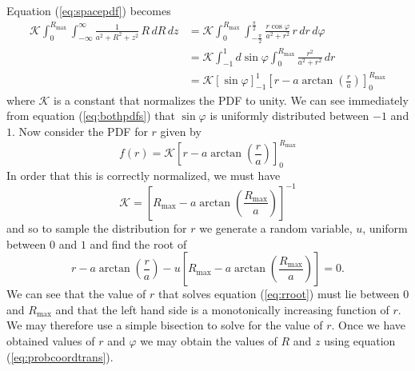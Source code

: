 Equation (\ref{eq:spacepdf}) becomes
\begin{equation}
\begin{split}
\mathcal{K} \int_0^{R_\mathrm{max}}\int_{-\infty}^{\infty} \frac{1}{a^2 + R^2 + z^2}\,R\, dR\, dz 
&= \mathcal{K} \int_0^{R_{\mathrm{max}}}\int_{-\frac{\pi}{2}}^{\frac{\pi}{2}} \frac{r\cos\varphi}{a^2+r^2}\,r\, dr \, d\varphi \\
&= \mathcal{K} \int_{-1}^{1} d\sin\varphi \int_0^{R_{\mathrm{max}}} \frac{r^2}{a^2+r^2}\, dr \\
&= \mathcal{K} \left[\sin\varphi\right]_{-1}^1 \left[r -
a\arctan\left(\frac{r}{a}\right)\right]_0^{R_{\mathrm{max}}}
\end{split}
\label{eq:bothpdfs}
\end{equation}
where $\mathcal{K}$ is a constant that normalizes the PDF to unity. We can see
immediately from equation (\ref{eq:bothpdfs}) that $\sin\varphi$ is uniformly
distributed between $-1$ and $1$. Now consider the PDF for $r$ given by
\begin{equation}
f(r) = \mathcal{K} \left[r - a\arctan\left(\frac{r}{a}\right)\right]_0^{R_{\mathrm{max}}}
\end{equation}
In order that this is correctly normalized, we must have
\begin{equation}
\mathcal{K} = 
\left[R_\mathrm{max} -
a\arctan\left(\frac{R_\mathrm{max}}{a}\right)\right]^{-1}
\end{equation}
and so to sample the distribution for $r$ we generate a random variable, $u$,
uniform between $0$ and $1$ and find the root of
\begin{equation}
r - a\arctan\left(\frac{r}{a}\right) - u \left[R_\mathrm{max} -
a\arctan\left(\frac{R_\mathrm{max}}{a}\right)\right] = 0.
\label{eq:rroot}
\end{equation}
We can see that the value of $r$ that solves equation (\ref{eq:rroot}) must
lie between $0$ and $R_\mathrm{max}$ and that the left hand side is a
monotonically increasing function of $r$. We may therefore use a simple 
bisection to solve for the value of $r$. Once we have obtained values of $r$
and $\varphi$ we may obtain the values of $R$ and $z$ using equation
(\ref{eq:probcoordtrans}). 

